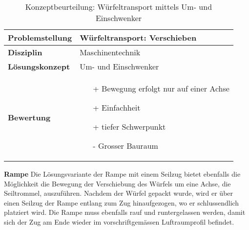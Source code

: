 \documentclass[../../main.tex]{subfiles}
\begin{document}
\begin{flushleft}
    \begin{table}[h]
    \begin{tabular}{ | l | p{11cm} |}
    \hline
    \textbf{Problemstellung} & Würfeltransport: Verschieben \\ \hline
    \textbf{Disziplin} & Maschinentechnik \\ \hline
    \textbf{Lösungskonzept} &  Um- und Einschwenker \\ \hline
    \textbf{Bewertung} &  \begin{itemize}
                            \item[+] Bewegung erfolgt nur auf einer Achse
                            \item[+] Einfachheit
                            \item[+] tiefer Schwerpunkt
                            \item[-] Grosser Bauraum
                          \end{itemize} \\ \hline
    \end{tabular}
    \caption{Konzeptbeurteilung: Würfeltransport mittels Um- und Einschwenker}
    \label{tab:konzept_wurfeltrransport_umschwenker}
\end{table}
\end{flushleft}
\textbf{Rampe}
Die Lösungsvariante der Rampe mit einem Seilzug bietet ebenfalls die Möglichkeit die Bewegung der Verschiebung des Würfels um eine Achse, die Seiltrommel, auszuführen. Nachdem der Würfel gepackt wurde, wird er über einen Seilzug der Rampe entlang zum Zug hinaufgezogen, wo er schlussendlich platziert wird. Die Rampe muss ebenfalls rauf und runtergelassen werden, damit sich der Zug am Ende wieder im vorschriftgemässen Luftraumprofil befindet.\\
\end{document}
